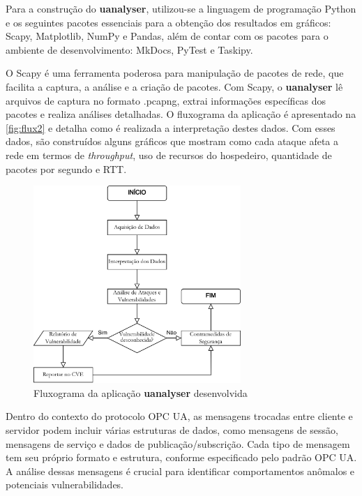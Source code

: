     Para a construção do \textbf{uanalyser}, utilizou-se a linguagem de programação Python e os seguintes pacotes essenciais para a obtenção dos resultados em gráficos: Scapy, Matplotlib, NumPy e Pandas, além de contar com os pacotes para o ambiente de desenvolvimento: MkDocs, PyTest e Taskipy.

    O Scapy é uma ferramenta poderosa para manipulação de pacotes de rede, que facilita a captura, a análise e a criação de pacotes. Com Scapy, o \textbf{uanalyser} lê arquivos de captura no formato .pcapng, extrai informações específicas dos pacotes e realiza análises detalhadas. O fluxograma da aplicação é apresentado na \autoref{fig:flux2} e detalha como é realizada a interpretação destes dados. Com esses dados, são construídos alguns gráficos que mostram como cada ataque afeta a rede em termos de \textit{throughput}, uso de recursos do hospedeiro, quantidade de pacotes por segundo e RTT.

    \begin{figure}[htbp!]
        \caption{\label{fig:flux2}Fluxograma da aplicação \textbf{uanalyser} desenvolvida}
        \begin{center}
            \includegraphics[width=0.7\textwidth]{USPSC-img/fluxograma.png}
        \end{center}
    \end{figure}

    Dentro do contexto do protocolo OPC UA, as mensagens trocadas entre cliente e servidor podem incluir várias estruturas de dados, como mensagens de sessão, mensagens de serviço e dados de publicação/subscrição. Cada tipo de mensagem tem seu próprio formato e estrutura, conforme especificado pelo padrão OPC UA. A análise dessas mensagens é crucial para identificar comportamentos anômalos e potenciais vulnerabilidades.

